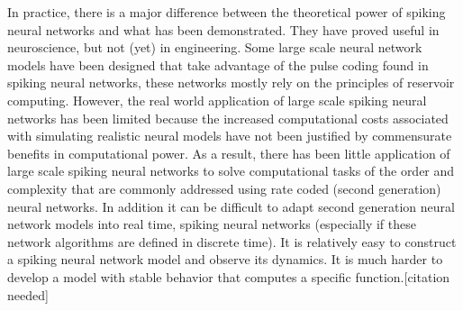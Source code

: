 In practice, there is a major difference between the theoretical power of spiking neural networks and what has been demonstrated. They have proved useful in neuroscience, but not (yet) in engineering. Some large scale neural network models have been designed that take advantage of the pulse coding found in spiking neural networks, these networks mostly rely on the principles of reservoir computing. However, the real world application of large scale spiking neural networks has been limited because the increased computational costs associated with simulating realistic neural models have not been justified by commensurate benefits in computational power. As a result, there has been little application of large scale spiking neural networks to solve computational tasks of the order and complexity that are commonly addressed using rate coded (second generation) neural networks. In addition it can be difficult to adapt second generation neural network models into real time, spiking neural networks (especially if these network algorithms are defined in discrete time). It is relatively easy to construct a spiking neural network model and observe its dynamics. It is much harder to develop a model with stable behavior that computes a specific function.[citation needed]



